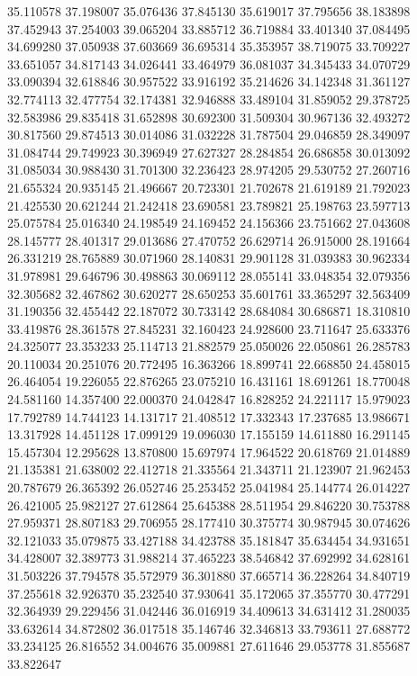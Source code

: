 35.110578
37.198007
35.076436
37.845130
35.619017
37.795656
38.183898
37.452943
37.254003
39.065204
33.885712
36.719884
33.401340
37.084495
34.699280
37.050938
37.603669
36.695314
35.353957
38.719075
33.709227
33.651057
34.817143
34.026441
33.464979
36.081037
34.345433
34.070729
33.090394
32.618846
30.957522
33.916192
35.214626
34.142348
31.361127
32.774113
32.477754
32.174381
32.946888
33.489104
31.859052
29.378725
32.583986
29.835418
31.652898
30.692300
31.509304
30.967136
32.493272
30.817560
29.874513
30.014086
31.032228
31.787504
29.046859
28.349097
31.084744
29.749923
30.396949
27.627327
28.284854
26.686858
30.013092
31.085034
30.988430
31.701300
32.236423
28.974205
29.530752
27.260716
21.655324
20.935145
21.496667
20.723301
21.702678
21.619189
21.792023
21.425530
20.621244
21.242418
23.690581
23.789821
25.198763
23.597713
25.075784
25.016340
24.198549
24.169452
24.156366
23.751662
27.043608
28.145777
28.401317
29.013686
27.470752
26.629714
26.915000
28.191664
26.331219
28.765889
30.071960
28.140831
29.901128
31.039383
30.962334
31.978981
29.646796
30.498863
30.069112
28.055141
33.048354
32.079356
32.305682
32.467862
30.620277
28.650253
35.601761
33.365297
32.563409
31.190356
32.455442
22.187072
30.733142
28.684084
30.686871
18.310810
33.419876
28.361578
27.845231
32.160423
24.928600
23.711647
25.633376
24.325077
23.353233
25.114713
21.882579
25.050026
22.050861
26.285783
20.110034
20.251076
20.772495
16.363266
18.899741
22.668850
24.458015
26.464054
19.226055
22.876265
23.075210
16.431161
18.691261
18.770048
24.581160
14.357400
22.000370
24.042847
16.828252
24.221117
15.979023
17.792789
14.744123
14.131717
21.408512
17.332343
17.237685
13.986671
13.317928
14.451128
17.099129
19.096030
17.155159
14.611880
16.291145
15.457304
12.295628
13.870800
15.697974
17.964522
20.618769
21.014889
21.135381
21.638002
22.412718
21.335564
21.343711
21.123907
21.962453
20.787679
26.365392
26.052746
25.253452
25.041984
25.144774
26.014227
26.421005
25.982127
27.612864
25.645388
28.511954
29.846220
30.753788
27.959371
28.807183
29.706955
28.177410
30.375774
30.987945
30.074626
32.121033
35.079875
33.427188
34.423788
35.181847
35.634454
34.931651
34.428007
32.389773
31.988214
37.465223
38.546842
37.692992
34.628161
31.503226
37.794578
35.572979
36.301880
37.665714
36.228264
34.840719
37.255618
32.926370
35.232540
37.930641
35.172065
37.355770
30.477291
32.364939
29.229456
31.042446
36.016919
34.409613
34.631412
31.280035
33.632614
34.872802
36.017518
35.146746
32.346813
33.793611
27.688772
33.234125
26.816552
34.004676
35.009881
27.611646
29.053778
31.855687
33.822647
